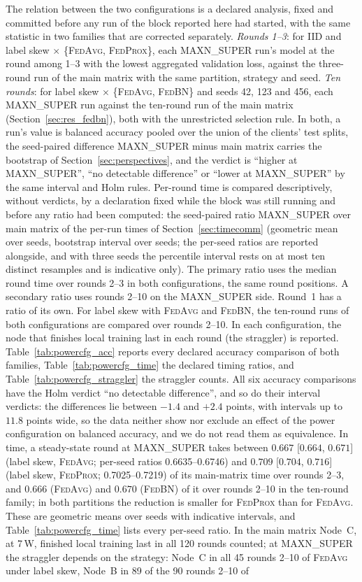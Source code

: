 \documentclass[journal]{IEEEtran}
\newcommand{\fedavg}{\textsc{FedAvg}}
\newcommand{\fedprox}{\textsc{FedProx}}
\newcommand{\fedbn}{\textsc{FedBN}}
\begin{document}
The relation between the two configurations is a declared analysis, fixed and committed before any run of the block reported here had started, with the same statistic in two families that are corrected separately. \emph{Rounds 1--3}: for IID and label skew $\times$ \{\fedavg{}, \fedprox{}\}, each MAXN\_SUPER run's model at the round among 1--3 with the lowest aggregated validation loss, against the three-round run of the main matrix with the same partition, strategy and seed. \emph{Ten rounds}: for label skew $\times$ \{\fedavg{}, \fedbn{}\} and seeds 42, 123 and 456, each MAXN\_SUPER run against the ten-round run of the main matrix (Section~\ref{sec:res_fedbn}), both with the unrestricted selection rule. In both, a run's value is balanced accuracy pooled over the union of the clients' test splits, the seed-paired difference MAXN\_SUPER minus main matrix carries the bootstrap of Section~\ref{sec:perspectives}, and the verdict is ``higher at MAXN\_SUPER'', ``no detectable difference'' or ``lower at MAXN\_SUPER'' by the same interval and Holm rules. Per-round time is compared descriptively, without verdicts, by a declaration fixed while the block was still running and before any ratio had been computed: the seed-paired ratio MAXN\_SUPER over main matrix of the per-run times of Section~\ref{sec:timecomm} (geometric mean over seeds, bootstrap interval over seeds; the per-seed ratios are reported alongside, and with three seeds the percentile interval rests on at most ten distinct resamples and is indicative only). The primary ratio uses the median round time over rounds 2--3 in both configurations, the same round positions. A secondary ratio uses rounds 2--10 on the MAXN\_SUPER side. Round~1 has a ratio of its own. For label skew with \fedavg{} and \fedbn{}, the ten-round runs of both configurations are compared over rounds 2--10. In each configuration, the node that finishes local training last in each round (the straggler) is reported. Table~\ref{tab:powercfg_acc} reports every declared accuracy comparison of both families, Table~\ref{tab:powercfg_time} the declared timing ratios, and Table~\ref{tab:powercfg_straggler} the straggler counts. All six accuracy comparisons have the Holm verdict ``no detectable difference'', and so do their interval verdicts: the differences lie between $-1.4$ and $+2.4$ points, with intervals up to $11.8$ points wide, so the data neither show nor exclude an effect of the power configuration on balanced accuracy, and we do not read them as equivalence. In time, a steady-state round at MAXN\_SUPER takes between $0.667$ [$0.664$, $0.671$] (label skew, \fedavg{}; per-seed ratios 0.6635--0.6746) and $0.709$ [$0.704$, $0.716$] (label skew, \fedprox{}; 0.7025--0.7219) of its main-matrix time over rounds 2--3, and $0.666$ (\fedavg{}) and $0.670$ (\fedbn{}) of it over rounds 2--10 in the ten-round family; in both partitions the reduction is smaller for \fedprox{} than for \fedavg{}. These are geometric means over seeds with indicative intervals, and Table~\ref{tab:powercfg_time} lists every per-seed ratio. In the main matrix Node~C, at 7\,W, finished local training last in all 120 rounds counted; at MAXN\_SUPER the straggler depends on the strategy: Node~C in all 45 rounds 2--10 of \fedavg{} under label skew, Node~B in 89 of the 90 rounds 2--10 of 
\end{document}
